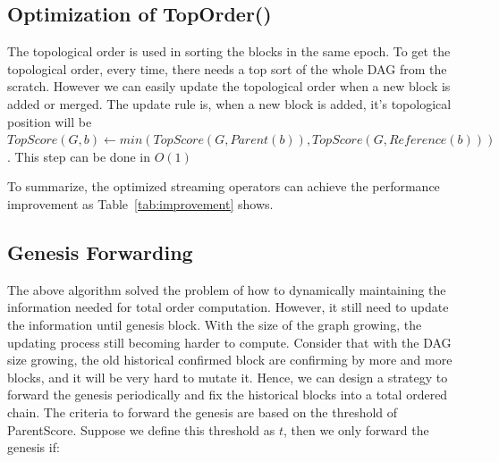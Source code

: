 \subsection{Optimization of TopOrder()}
The topological order is used in sorting the blocks in the same epoch.
To get the topological order, every time, there needs a top sort of the whole DAG from the scratch.
However we can easily update the topological order when a new block is added or merged.
 The update rule is, when a new block is added, it's topological position will be $TopScore(G, b) \gets min(TopScore(G, Parent(b)), TopScore(G, Reference(b)))$. This step can be done in $O(1)$ 


To summarize, the optimized streaming operators can achieve the performance improvement as Table~\ref{tab:improvement} shows. 

\begin{table}[]
\caption {Analysis of Graph properties calculation} \label{tab:improvement}
\begin{center}
\end{center}
\end{table}

\subsection{Genesis Forwarding}
The above algorithm solved the problem of how to dynamically maintaining the information needed for total order computation.
However, it still need to update the information until genesis block. 
With the size of the graph growing, the updating process still becoming harder to compute.
Consider that with the DAG size growing, the old historical confirmed block are confirming by more and more blocks, and it will be very hard to mutate it.
Hence, we can design a strategy to forward the genesis periodically and fix the historical blocks into a total ordered chain.
The criteria to forward the genesis are based on the threshold of ParentScore.
Suppose we define this threshold as $t$, then we only forward the genesis if: 


